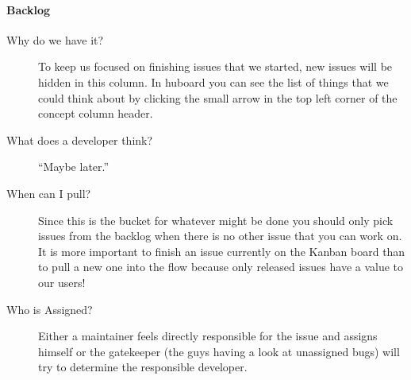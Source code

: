 \documentclass[letterpaper,10pt,english]{sphinxmanual}
\begin{document}
\paragraph{Backlog}
\label{bugtracker/kanban:backlog}\begin{description}
\item[{Why do we have it?}] \leavevmode
To keep us focused on finishing issues that we started, new issues will be
hidden in this column. In huboard you can see the list of things that we could
think about by clicking the small arrow in the top left corner of the concept
column header.

\item[{What does a developer think?}] \leavevmode
``Maybe later.''

\item[{When can I pull?}] \leavevmode
Since this is the bucket for whatever might be done you should only pick
issues from the backlog when there is no other issue that you can work on. It
is more important to finish an issue currently on the Kanban board than to
pull a new one into the flow because only released issues have a value to our
users!

\item[{Who is Assigned?}] \leavevmode
Either a maintainer feels directly responsible for the issue and assigns
himself or the gatekeeper (the guys having a look at unassigned bugs) will try
to determine the responsible developer.

\end{description}
\end{document}
